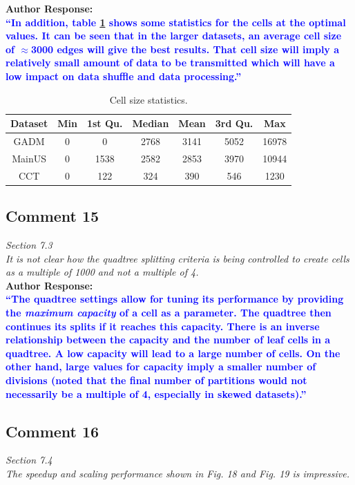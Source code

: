 \documentclass[10pt]{article}
\newcounter{tablemajor}
\newcommand*\settablecounter[1]{%
        \setcounter{tablemajor}{#1}%
}
\begin{document}
\textbf{Author Response:}\\

\textbf{\textcolor{blue}{
``In addition, table \ref{tab:cell_stats} shows some statistics for the cells at the optimal values.  It can be seen that in the larger datasets, an average cell size of $\approx$3000 edges will give the best results. That cell size will imply a relatively small amount of data to be transmitted which will have a low impact on data shuffle and data processing.''
}}

\settablecounter{5}
\begin{table}[h!]
    \centering
    \caption{Cell size statistics.}
    \label{tab:cell_stats}
    \begin{tabular}{ccccccc}
        \hline
        Dataset & Min & 1st Qu. & Median & Mean & 3rd Qu. & Max   \\
        \hline
        GADM    & 0   & 0       & 2768   & 3141 & 5052    & 16978 \\
        MainUS  & 0   & 1538    & 2582   & 2853 & 3970    & 10944 \\
        CCT     & 0   & 122     & 324    & 390  & 546     & 1230  \\
        \hline
    \end{tabular}
\end{table}

\subsection*{Comment 15}
\textit{
Section 7.3\\
It is not clear how the quadtree splitting criteria is being controlled to create cells as a multiple of 1000 and not a multiple of 4.
} \\

\textbf{Author Response:}\\

\textbf{\textcolor{blue}{
``The quadtree settings allow for tuning its performance by providing the \textit{maximum capacity} of a cell as a parameter. The quadtree then continues its splits if it reaches this capacity. There is an inverse relationship between the capacity and the number of leaf cells in a quadtree.
A low capacity will lead to a large number of cells. On the other hand, large values for capacity imply a smaller number of divisions (noted that the final number of partitions would not necessarily be a multiple of 4, especially in skewed datasets).''
}}

\subsection*{Comment 16}
\textit{
Section 7.4\\
The speedup and scaling performance shown in Fig. 18 and Fig. 19 is impressive.
} \\
\end{document}
